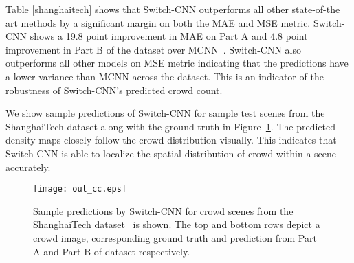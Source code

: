 \documentclass[10pt,twocolumn,letterpaper]{article}
\begin{document}
Table \ref{shanghaitech} shows that Switch-CNN outperforms all other state-of-the art methods by a significant margin on both the MAE and MSE metric. Switch-CNN shows a 19.8 point improvement in MAE on Part A and 4.8 point improvement in Part B of the dataset over  MCNN~\cite{zhang2016single}. Switch-CNN also outperforms all other models on MSE metric indicating that the predictions have a lower variance than MCNN across the dataset. This is an indicator of the robustness of Switch-CNN's predicted crowd count.


We show sample predictions of Switch-CNN for sample test scenes from the ShanghaiTech dataset along with the ground truth in Figure~\ref{stpred}. The predicted density maps closely follow the crowd distribution visually. This indicates that Switch-CNN is able to localize the spatial distribution of crowd within a scene accurately.


\begin{figure}[!t]
 \texttt{[image: out\_cc.eps]}\hspace{0.3cm}%
 \caption{Sample predictions by Switch-CNN for crowd scenes from the ShanghaiTech dataset~\cite{zhang2016single} is shown. The top and bottom rows depict a crowd image, corresponding ground truth and prediction from Part A and Part B of dataset respectively.}
\label{stpred}
\end{figure}

\begin{table}[!h]
\centering
{}

\vspace*{1.2mm}
\caption{Comparison of Switch-CNN with other state-of-the-art crowd counting methods on ShanghaiTech dataset~\cite{zhang2016single}.}
\label{shanghaitech}

\end{table}
\end{document}
